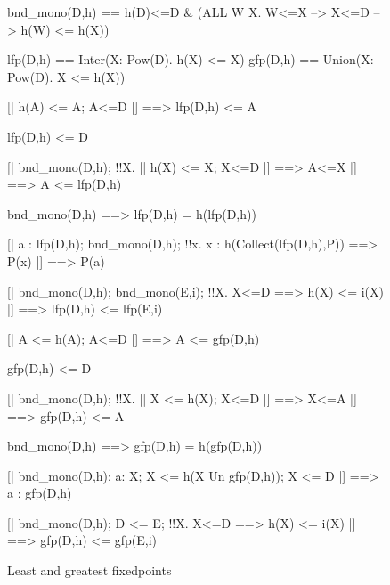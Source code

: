 \begin{figure}
\begin{ttbox}
   bnd_mono(D,h) == 
                 h(D)<=D & (ALL W X. W<=X --> X<=D --> h(W) <= h(X))

        lfp(D,h) == Inter({X: Pow(D). h(X) <= X})
        gfp(D,h) == Union({X: Pow(D). X <= h(X)})

 [| h(A) <= A;  A<=D |] ==> lfp(D,h) <= A

     lfp(D,h) <= D

   [| bnd_mono(D,h);  
                  !!X. [| h(X) <= X;  X<=D |] ==> A<=X 
               |] ==> A <= lfp(D,h)

     bnd_mono(D,h) ==> lfp(D,h) = h(lfp(D,h))

         [| a : lfp(D,h);  bnd_mono(D,h);
                  !!x. x : h(Collect(lfp(D,h),P)) ==> P(x)
               |] ==> P(a)

       [| bnd_mono(D,h);  bnd_mono(E,i);
                  !!X. X<=D ==> h(X) <= i(X)  
               |] ==> lfp(D,h) <= lfp(E,i)

 [| A <= h(A);  A<=D |] ==> A <= gfp(D,h)

     gfp(D,h) <= D

      [| bnd_mono(D,h);  
                  !!X. [| X <= h(X);  X<=D |] ==> X<=A
               |] ==> gfp(D,h) <= A

     bnd_mono(D,h) ==> gfp(D,h) = h(gfp(D,h))

       [| bnd_mono(D,h); a: X; X <= h(X Un gfp(D,h)); X <= D 
               |] ==> a : gfp(D,h)

       [| bnd_mono(D,h);  D <= E;
                  !!X. X<=D ==> h(X) <= i(X)  
               |] ==> gfp(D,h) <= gfp(E,i)
\end{ttbox}
\caption{Least and greatest fixedpoints} \label{zf-fixedpt}
\end{figure}


